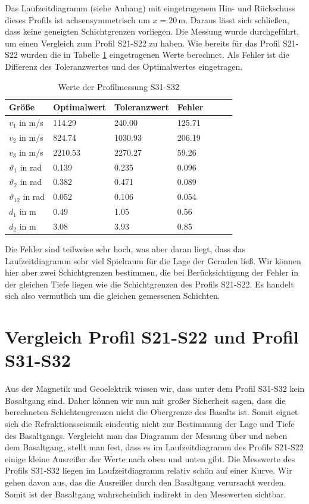 Das Laufzeitdiagramm (siehe Anhang) mit eingetragenem Hin- und Rückschuss dieses Profils ist achsensymmetrisch um $x=20$\,m. Daraus lässt sich schließen, dass keine geneigten Schichtgrenzen vorliegen.
Die Messung wurde durchgeführt, um einen Vergleich zum Profil S21-S22 zu haben.
Wie bereits für das Profil S21-S22 wurden die in Tabelle \ref{tab:S31-S32} eingetragenen Werte berechnet. Als Fehler ist die Differenz des Toleranzwertes und des Optimalwertes eingetragen.

\begin{table}[!ht]
\centering
\caption{Werte der Profilmessung S31-S32}
\label{tab:S31-S32}
\begin{tabular}{lllllll}
\toprule
Größe   & Optimalwert   & Toleranzwert   & Fehler \\
\midrule
$v_1$ in m/s & 114.29 & 240.00 &  125.71\\
$v_2$ in m/s & 824.74 & 1030.93 & 206.19 \\
$v_3$ in m/s & 2210.53 & 2270.27 & 59.26 \\
$\vartheta_1$ in rad & 0.139 & 0.235 & 0.096  \\
$\vartheta_2$ in rad & 0.382 & 0.471 & 0.089 \\
$\vartheta_{12}$ in rad & 0.052 & 0.106 & 0.054 \\
$d_1$ in m & 0.49 & 1.05 & 0.56 \\
$d_2$ in m & 3.08 & 3.93 & 0.85 \\
\bottomrule
\end{tabular}
\end{table}

Die Fehler sind teilweise sehr hoch, was aber daran liegt, dass das Laufzeitdiagramm sehr viel Spielraum für die Lage der Geraden ließ. 
Wir können hier aber zwei Schichtgrenzen bestimmen, die bei Berücksichtigung der Fehler in der gleichen Tiefe liegen wie die Schichtgrenzen des Profils S21-S22. Es handelt sich also vermutlich um die gleichen gemessenen Schichten.

\section{Vergleich Profil S21-S22 und Profil S31-S32}

Aus der Magnetik und Geoelektrik wissen wir, dass unter dem Profil S31-S32 kein Basaltgang sind. Daher können wir nun mit großer Sicherheit sagen, dass die berechneten Schichtengrenzen nicht die Obergrenze des Basalts ist. Somit eignet sich die Refraktionsseismik eindeutig nicht zur Bestimmung der Lage und Tiefe des Basaltgangs. Vergleicht man das Diagramm der Messung über und neben dem Basaltgang, stellt man fest, dass es im Laufzeitdiagramm des Profils S21-S22 einige kleine Ausreißer der Werte nach oben und unten gibt. Die Messwerte des Profils S31-S32 liegen im Laufzeitdiagramm relativ schön auf einer Kurve. Wir gehen davon aus, das die Ausreißer durch den Basaltgang verursacht werden. Somit ist der Basaltgang wahrscheinlich indirekt in den Messwerten sichtbar.

